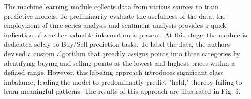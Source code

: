 {%

The machine learning module collects data from various sources to train
predictive models. To preliminarily evaluate the usefulness of the data,
the employment of time-series analysis and sentiment analysis provides a
quick indication of whether valuable information is present. At this
stage, the module is dedicated solely to Buy/Sell prediction tasks. To
label the data, the authors devised a custom algorithm that greedily
assigns points into three categories by identifying buying and selling
points at the lowest and highest prices within a defined range. However,
this labeling approach introduces significant class imbalance, leading
the model to predominantly predict "hold," thereby failing to learn
meaningful patterns. The results of this approach are illustrated in
Fig. 6.

}
